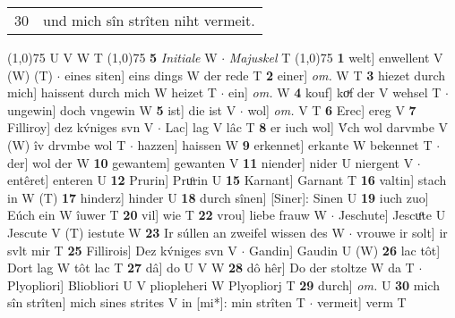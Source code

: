 \documentclass[8pt,a4paper,notitlepage]{article}
\begin{document}
\begin{table}[ht]
\begin{minipage}[t]{0.5\linewidth}
\begin{tabular}{rl}
30 & und mich sîn strîten niht vermeit.\\ 
\end{tabular}
\scriptsize
\line(1,0){75} \newline
U V W T \newline
\line(1,0){75} \newline
\textbf{5} \textit{Initiale} W   $\cdot$ \textit{Majuskel} T  \newline
\line(1,0){75} \newline
\textbf{1} welt] enwellent V (W) (T)  $\cdot$ eines siten] eins dings W der rede T \textbf{2} einer] \textit{om.} W T \textbf{3} hiezet durch mich] haissent durch mich W heizet T  $\cdot$ ein] \textit{om.} W \textbf{4} kouf] koͮf der V wehsel T  $\cdot$ ungewin] doch vngewin W \textbf{5} ist] die ist V  $\cdot$ wol] \textit{om.} V T \textbf{6} Erec] ereg V \textbf{7} Filliroy] dez kv́niges svn V  $\cdot$ Lac] lag V lâc T \textbf{8} er iuch wol] V́ch wol darvmbe V (W) îv drvmbe wol T  $\cdot$ hazzen] haissen W \textbf{9} erkennet] erkante W bekennet T  $\cdot$ der] wol der W \textbf{10} gewantem] gewanten V \textbf{11} niender] nider U niergent V  $\cdot$ entêret] enteren U \textbf{12} Prurin] Pruͦrin U \textbf{15} Karnant] Garnant T \textbf{16} valtin] stach in W (T) \textbf{17} hinderz] hinder U \textbf{18} durch sînen] [Siner]: Sinen U \textbf{19} iuch zuo] Eúch ein W îuwer T \textbf{20} vil] wie T \textbf{22} vrou] liebe frauw W  $\cdot$ Jeschute] Jescuͦte U Jescute V (T) iestute W \textbf{23} Ir súllen an zweifel wissen des W  $\cdot$ vrouwe ir solt] ir svlt mir T \textbf{25} Fillirois] Dez kv́niges svn V  $\cdot$ Gandin] Gaudin U (W) \textbf{26} lac tôt] Dort lag W tôt lac T \textbf{27} dâ] do U V W \textbf{28} dô hêr] Do der stoltze W da T  $\cdot$ Plyopliori] Bliobliori U V pliopleheri W Plyopliorj T \textbf{29} durch] \textit{om.} U \textbf{30} mich sîn strîten] mich sines strites V in [mi*]: min strîten T  $\cdot$ vermeit] verm T \newline
\end{minipage}
\end{table}
\end{document}
